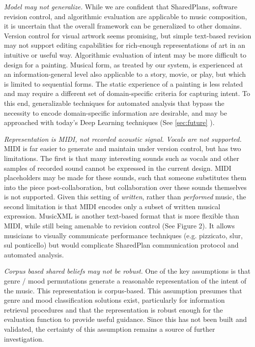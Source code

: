 \documentclass[final,authoryear,5p,times,twocolumn]{elsarticle}
\begin{document}
\textit{Model may not generalize.} While we are confident that SharedPlans, software revision control, and algorithmic evaluation are applicable to music composition, it is uncertain that the overall framework can be generalized to other domains. Version control for visual artwork seems promising, but simple text-based revision may not support editing capabilities for rich-enough representations of art in an intuitive or useful way.  Algorithmic evaluation of intent may be more difficult to design for a painting. Musical form, as treated by our system, is experienced at an information-general level also applicable to a story, movie, or play, but which is limited to sequential forms. The static experience of a painting is less related and may require a different set of domain-specific criteria for capturing intent. To this end, generalizable techniques for automated analysis that bypass the necessity to encode domain-specific information are desirable, and may be approached with today's Deep Learning techniques (See \ref{sec:future} ).

\textit{Representation is MIDI, not recorded acoustic signal. Vocals are not supported.} MIDI is far easier to generate and maintain under version control, but has two limitations. The first is that many interesting sounds such as vocals and other samples of recorded sound cannot be expressed in the current design. MIDI placeholders may be made for these sounds, such that someone substitutes them into the piece post-collaboration, but collaboration over these sounds themselves is not supported. Given this setting of \textit{written}, rather than \textit{performed} music, the second limitation is that MIDI encodes only a subset of written musical expression. MusicXML is another text-based format that is more flexible than MIDI, while still being amenable to revision control (See Figure 2). It allows musicians to visually communicate performance techniques (e.g. pizzicato, slur, sul ponticello) but would complicate SharedPlan communication protocol and automated analysis.

\textit{Corpus based shared beliefs may not be robust.} One of the key assumptions is that genre / mood permutations generate a reasonable representation of the intent of the music. This representation is corpus-based. This assumption presumes that genre and mood classification solutions exist, particularly for information retrieval procedures and that the representation is robust enough for the evaluation function to provide useful guidance. Since this has not been built and validated, the certainty of this assumption remains a source of further investigation.
\end{document}
